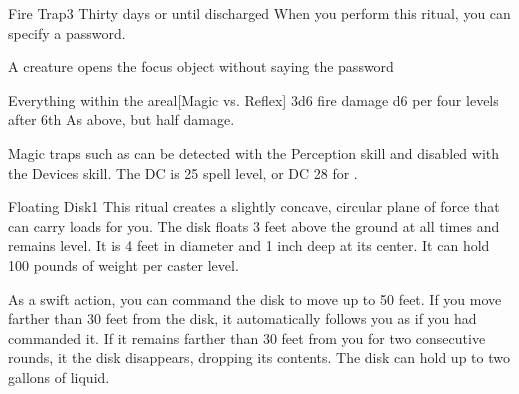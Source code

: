 \begin{spellsection}{Fire Trap}{3}
\spelldur Thirty days or until discharged \dismissable
\spellspecial When you perform this ritual, you can specify a password.
\spellline
\begin{spelltrigger}{A creature opens the focus object without saying the password}
    \begin{spelltargets}{Everything within the area}l[Magic vs. Reflex]
        \spellsuccess 3d6 fire damage \add d6 per four levels after 6th
        \spellfailure As above, but half damage.
    \end{spelltargets}
\end{spelltrigger}
\spellnotes \firespellnotes

\par Magic traps such as  can be detected with the Perception skill and disabled with the Devices skill. The DC is 25 \add spell level, or DC 28 for .
\end{spellsection}

\begin{spellsection}{Floating Disk}{1}
\spellrng{\rngmed}
\spelldur \durext \dismissable
{}
\spellline
\spelleffect This ritual creates a slightly concave, circular plane of force that can carry loads for you. The disk floats 3 feet above the ground at all times and remains level. It is 4 feet in diameter and 1 inch deep at its center. It can hold 100 pounds of weight per caster level.

As a swift action, you can command the disk to move up to 50 feet. If you move farther than 30 feet from the disk, it automatically follows you as if you had commanded it. If it remains farther than 30 feet from you for two consecutive rounds, it the disk disappears, dropping its contents.
\spellnotes The disk can hold up to two gallons of liquid.
\end{spellsection}

